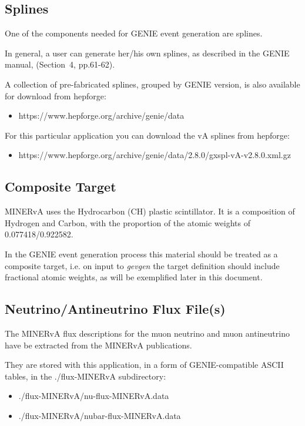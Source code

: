 \subsection{Splines}

One of the components needed for GENIE event generation are splines.

In general, a user can generate her/his own splines, as described in the GENIE manual\cite{geniemanual}, 
(Section~4, pp.61-62).

A collection of pre-fabricated splines, grouped by GENIE version, is also available for download from hepforge:
\begin{itemize}
\item{https://www.hepforge.org/archive/genie/data}
\end{itemize} 


For this particular application you can download the vA splines from hepforge:
\begin{itemize}
\item{https://www.hepforge.org/archive/genie/data/2.8.0/gxspl-vA-v2.8.0.xml.gz}
\end{itemize}

\subsection{Composite Target}
  
MINERvA uses the Hydrocarbon (CH) plastic scintillator.
It is a composition of Hydrogen and Carbon, with the proportion of the atomic weights of 0.077418/0.922582. 

In the GENIE event generation process this material should be treated as a composite target, i.e. on input 
to {\it gevgen} the target definition should include fractional atomic weights, as will be exemplified later 
in this document.

\subsection{Neutrino/Antineutrino Flux File(s)}
  
The MINERvA flux descriptions for the muon neutrino and muon antineutrino have be extracted from the MINERvA 
publications\cite{minerva1}.

They are stored with this application, in a form of GENIE-compatible ASCII tables, in the ./flux-MINERvA subdirectory:
\begin{itemize} 
\item{./flux-MINERvA/nu-flux-MINERvA.data}
\item{./flux-MINERvA/nubar-flux-MINERvA.data}
\end{itemize}

